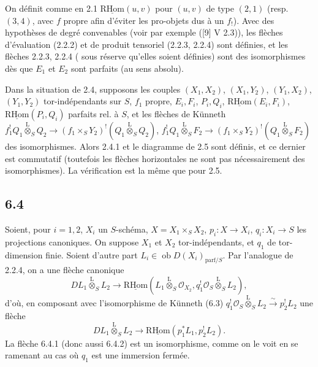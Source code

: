 \documentclass[11pt]{article}
\providecommand{\cO}{\mathcal{O}}
\newcommand{\R}{\mathrm{R}}\newcommand{\RHomCore}{\mathrm{RHom}}
\providecommand{\RHom}{\RHomCore}
\providecommand{\uRHom}{\underline{\RHom}}
\providecommand{\RHom}{\RHomCore}
\providecommand{\RHom}{\R\mathcal{H}om}
\providecommand{\R}{\mathrm R}
\providecommand{\RHom}{\RHomCore}
\begin{document}
On définit comme en 2.1 $\uRHom(u,v)$ pour $(u,v)$ de type $(2,1)$ (resp. $(3,4)$, avec $f$ propre afin d'éviter les pro-objets dus à un $f_!$). Avec des hypothèses de degré convenables (voir par exemple ([9] V 2.3)), les flèches d'évaluation (2.2.2) et de produit tensoriel (2.2.3, 2.2.4) sont définies, et les flèches 
2.2.3, 2.2.4 (
sous réserve qu'elles soient définies) sont des isomorphismes dès que $E_1$ et $E_2$ sont parfaits (au sens absolu).

Dans la situation de 2.4, supposons les couples $(X_1,X_2)$, $(X_1,Y_2)$, $(Y_1,X_2)$, $(Y_1,Y_2)$ tor-indépendants sur $S$, $f_1$ propre, $E_i,F_i$, $P_i,Q_i$, $\uRHom(E_i,F_i)$, $\uRHom(P_i,Q_i)$ parfaits rel. à $S$, et les flèches de Künneth $f_1^!Q_1\overset{\mathrm{L}}{\otimes}_SQ_2\to(f_1\times_SY_2)^!(Q_1\overset{\mathrm{L}}{\otimes}_SQ_2)$, $f_1^!Q_1\overset{\mathrm{L}}{\otimes}_SF_2\to(f_1\times_SY_2)^!(Q_1\overset{\mathrm{L}}{\otimes}_SF_2)$ des isomorphismes. Alors 2.4.1 et le diagramme de 2.5 sont définis, et ce dernier est commutatif (toutefois les flèches horizontales ne sont pas nécessairement des isomorphismes). La vérification est la même que pour 2.5.

\subsection*{6.4}
Soient, pour $i=1,2$, $X_i$ un $S$-schéma, $X=X_1\times_SX_2$, $p_i:X\to X_i$, $q_i:X_i\to S$ les projections canoniques. On suppose $X_1$ et $X_2$ tor-indépendants, et $q_1$ de tor-dimension finie. Soient d'autre part $L_i\in\operatorname{ob}D(X_i)_{\mathrm{parf}/S}$. Par l'analogue de 2.2.4, on a une flèche canonique
\begin{equation}
\tag{6.4.1}
DL_1\overset{\mathrm{L}}{\otimes}_SL_2\longrightarrow \uRHom(L_1\overset{\mathrm{L}}{\otimes}_S\cO_{X_2},q_1^!\cO_S\overset{\mathrm{L}}{\otimes}_SL_2),
\end{equation}
d'où, en composant avec l'isomorphisme de Künneth (6.3) $q_1^!\cO_S\overset{\mathrm{L}}{\otimes}_SL_2\xrightarrow{\sim}p_2^!L_2$ une flèche
\begin{equation}
\tag{6.4.2}
DL_1\overset{\mathrm{L}}{\otimes}_SL_2\longrightarrow\uRHom(p_1^*L_1,p_2^!L_2).
\end{equation}
La flèche 6.4.1 (donc aussi 6.4.2) est un isomorphisme, comme on le voit en se ramenant au cas où $q_1$ est une immersion fermée.
\end{document}
